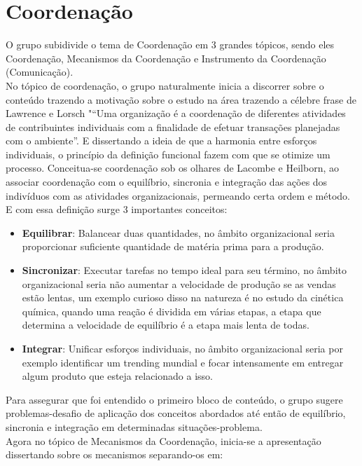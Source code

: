 \documentclass[oneside]{book}
\newcommand\tab[1][1cm]{\hspace*{#1}}
\theoremstyle{definition}
\begin{document}
            \chapter{Coordenação}
            \tab O grupo subidivide o tema de Coordenação em 3 grandes tópicos, sendo eles Coordenação, Mecanismos da Coordenação e Instrumento da Coordenação (Comunicação).\\
            \tab No tópico de coordenação, o grupo naturalmente inicia a discorrer sobre o conteúdo trazendo a motivação sobre o estudo na área trazendo a célebre frase de Lawrence e Lorsch "“Uma organização é a coordenação de diferentes atividades de contribuintes individuais com a finalidade de efetuar transações planejadas com o ambiente”. E dissertando a ideia de que a harmonia entre esforços individuais, o princípio da definição funcional fazem com que se otimize um processo. Conceitua-se coordenação sob os olhares de Lacombe e Heilborn, ao associar coordenação com o equilíbrio, sincronia e integração das ações dos indivíduos com as atividades organizacionais, permeando certa ordem e método. E com essa definição surge 3 importantes conceitos:
            \begin{itemize}
                \item \textbf{Equilibrar}: Balancear duas quantidades, no âmbito organizacional seria proporcionar suficiente quantidade de matéria prima para a produção.
                \item \textbf{Sincronizar}: Executar tarefas no tempo ideal para seu término, no âmbito organizacional seria não aumentar a velocidade de produção se as vendas estão lentas, um exemplo curioso disso na natureza é no estudo da cinética química, quando uma reação é dividida em várias etapas, a etapa que determina a velocidade de equilíbrio é a etapa mais lenta de todas.
                \item \textbf{Integrar}: Unificar esforços individuais, no âmbito organizacional seria por exemplo identificar um trending mundial e focar intensamente em entregar algum produto que esteja relacionado a isso.
            \end{itemize}
            \tab Para assegurar que foi entendido o primeiro bloco de conteúdo, o grupo sugere problemas-desafio de aplicação dos conceitos abordados até então de equilíbrio, sincronia e integração em determinadas situações-problema.\\
            \tab Agora no tópico de Mecanismos da Coordenação, inicia-se a apresentação dissertando sobre os mecanismos separando-os em:
\end{document}
